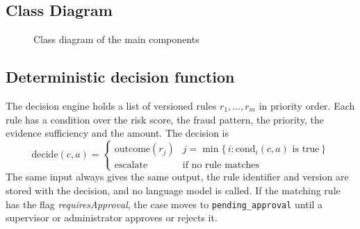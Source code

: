 \documentclass[oneside,a4paper,12pt]{report}
\begin{document}
\subsection{Class Diagram}
\begin{figure}[H]
\centering
{}
\caption{Class diagram of the main components}
\label{fig:class-dig}
\end{figure}

\subsection{Deterministic decision function}
The decision engine holds a list of versioned rules $r_1,\dots,r_m$ in priority order. Each rule has a condition over the risk score, the fraud pattern, the priority, the evidence sufficiency and the amount. The decision is
\begin{equation}
  \mathrm{decide}(c,a) =
  \begin{cases}
     \mathrm{outcome}(r_j) & j = \min\{\, i : \mathrm{cond}_i(c,a) \text{ is true} \,\} \\
     \text{escalate} & \text{if no rule matches}
  \end{cases}
\end{equation}
The same input always gives the same output, the rule identifier and version are stored with the decision, and no language model is called. If the matching rule has the flag \emph{requiresApproval}, the case moves to \texttt{pending\_approval} until a supervisor or administrator approves or rejects it.
\end{document}
